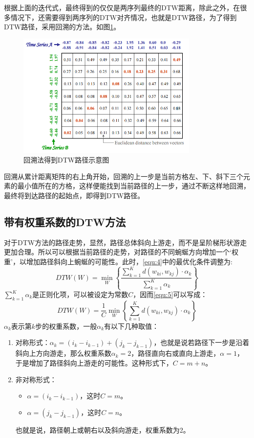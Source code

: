 根据上面的迭代式，最终得到的仅仅是两序列最终的DTW距离，除此之外，在很多情况下，还需要得到两序列的DTW对齐情况，也就是DTW路径，为了得到DTW路径，采用回溯的方法。如图\ref{fig:6}。
\begin{figure}[h]
  \centering
  \includegraphics[width=0.8\textwidth]{./figure/trace_back.PNG}
  \caption{回溯法得到DTW路径示意图}\label{fig:6}
\end{figure}

回溯从累计距离矩阵的右上角开始，回溯的上一步是当前方格左、下、斜下三个元素的最小值所在的方格，这样便能找到当前路径的上一步，通过不断这样地回溯，最终将到达路径的起始点，即得到DTW路径。

\subsection{带有权重系数的DTW方法}
对于DTW方法的路径走势，显然，路径总体斜向上游走，而不是呈阶梯形状游走更加合理。所以可以根据当前路径的走势，对路径的不同蜿蜒方向增加一个‘权重’，以增加路径斜向上蜿蜒的可能性。此时，\ref{equ:4}中的最优化条件调整为:
\begin{equation}\label{equ:5}
  DTW(W) = \mathop {\min }\limits_W \left\{ {\frac{{\sum\limits_{k = 1}^K {d\left( {{w_{ki}},{w_{kj}}} \right) \cdot {\alpha _k}} }}{{\sum\limits_{k = 1}^K {{\alpha _k}} }}} \right\}
\end{equation}
${\sum\limits_{k = 1}^K {{\alpha _k}} }$是正则化项，可以被设定为常数$C$，因而\ref{equ:5}可以写成：
\begin{equation}\label{equ:6}
  DTW(W) = \frac{1}{C}\mathop {\min }\limits_W \left\{ {\sum\limits_{k = 1}^K {d\left( {{w_{ki}},{w_{kj}}} \right) \cdot {\alpha _k}} } \right\}
\end{equation}
$\alpha_k$表示第$k$步的权重系数，一般$\alpha_k$有以下几种取值：
\begin{enumerate}
  \item 对称形式：$\alpha_k = (i_k - i_{k-1})+(j_k - j_{k-1})$，也就是说若路径下一步是沿着斜向上方向游走，那么权重系数$\alpha_k = 2$，路径直向右或直向上游走，$\alpha = 1$，于是增加了路径斜向上游走的可能性。这种形式下，$C = m+n$。
  \item 非对称形式：
  \begin{itemize}
          \item $\alpha = (i_k - i_{k-1})$，这时$C = m$。
          \item $\alpha = (j_k - j_{k-1})$，这时$C = n$。
  \end{itemize}
  也就是说，路径朝上或朝右以及斜向游走，权重系数为2。
\end{enumerate}

